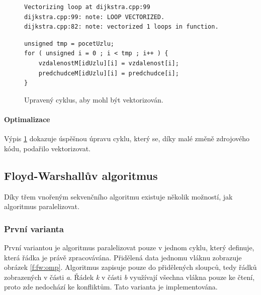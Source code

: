\begin{figure}
    \centering
    \caption{Upravený cyklus, aby mohl být vektorizován.}
	\label{f:dij:vect3}
    \begin{lstlisting}
Vectorizing loop at dijkstra.cpp:99
dijkstra.cpp:99: note: LOOP VECTORIZED.
dijkstra.cpp:82: note: vectorized 1 loops in function.
    \end{lstlisting}
    
	\begin{lstlisting}
unsigned tmp = pocetUzlu;
for ( unsigned i = 0 ; i < tmp ; i++ ) {
	vzdalenostM[idUzlu][i] = vzdalenost[i];
	predchudceM[idUzlu][i] = predchudce[i];
}
	\end{lstlisting}
\end{figure}

\paragraph{Optimalizace}
Výpis \ref{f:dij:vect3} dokazuje úspěšnou úpravu cyklu, který se, díky malé změně zdrojového kódu, podařilo vektorizovat.



\subsection{Floyd-Warshallův algoritmus}
Díky třem vnořeným sekvenčního algoritmu existuje několik možností, jak algoritmus paralelizovat.

\subsubsection{První varianta}
První variantou je algoritmus paralelizovat pouze v jednom cyklu, který definuje, která řádka je právě zpracovávána. Přidělená data jednomu vláknu zobrazuje obrázek \ref{f:fw:omp}. Algoritmus zapisuje pouze do přidělených sloupců, tedy řádků zobrazených v části \textit{a}. Řádek \textit{k} v části \textit{b} využívají všechna vlákna pouze ke čtení, proto zde nedochází ke konfliktům. Tato varianta je implementována.

